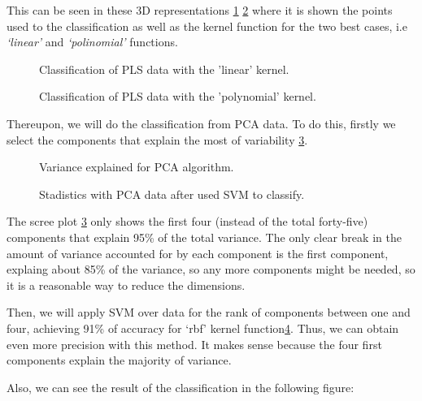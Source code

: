 This can be seen in these 3D representations \ref{fig:Classification3D_PLS_linear} \ref{fig:Classification3D_PLS_poly} where it is shown the points used to the classification as well as the kernel function for the two best cases, i.e \textit{‘linear’} and \textit{‘polinomial’} functions.

\begin{figure}[H]
	\centering
	\caption{Classification of PLS data with the 'linear' kernel.}
	\label{fig:Classification3D_PLS_linear}
\end{figure}

\begin{figure}[H]
	\centering
	\caption{Classification of PLS data with the 'polynomial' kernel.}
	\label{fig:Classification3D_PLS_poly}
\end{figure}

Thereupon, we will do the classification from PCA data. To do this, firstly we select the components that explain the most of variability \ref{fig:variance_PCA}.

\begin{figure}[H]
	\centering
	\caption{Variance explained for PCA algorithm.}
	\label{fig:variance_PCA}
\end{figure} 

\begin{figure}[H]
	\centering
	\caption{Stadistics with PCA data after used SVM to classify.}
	\label{fig:stadistics_PCA}
	\end{figure}
The scree plot \ref{fig:variance_PCA} only shows the first four (instead of the total forty-five) components that explain 95\% of the total variance. The only clear break in the amount of variance accounted for by each component is the first component, explaing about 85\% of the variance, so any more components might be needed, so it is  a reasonable way to reduce the dimensions.

Then, we will apply SVM over data for the rank of components between one and four, achieving 91\% of accuracy for ‘rbf’ kernel function\ref{fig:stadistics_PCA}. Thus, we can obtain even more precision with this method. It makes sense because the four first components explain the majority of variance.

Also, we can see the result of the classification in the following figure:

